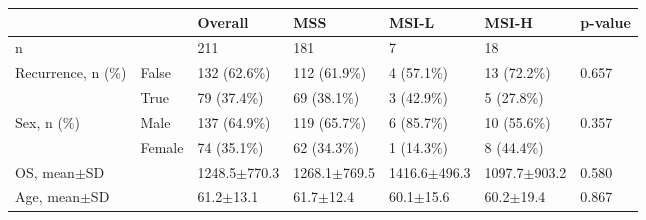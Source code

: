 \begin{tabular}{lllllll}
\hline
& & Overall & MSS & MSI-L & MSI-H & p-value \\
\hline
 n & & 211 & 181 & 7 & 18 & \\
 Recurrence, n (\%) & False & 132 (62.6\%) & 112 (61.9\%) & 4 (57.1\%) & 13 (72.2\%) & 0.657 \\
 & True & 79 (37.4\%) & 69 (38.1\%) & 3 (42.9\%) & 5 (27.8\%) & \\
 Sex, n (\%) & Male & 137 (64.9\%) & 119 (65.7\%) & 6 (85.7\%) & 10 (55.6\%) & 0.357 \\
 & Female & 74 (35.1\%) & 62 (34.3\%) & 1 (14.3\%) & 8 (44.4\%) & \\
 OS, mean$\pm$SD & & 1248.5$\pm$770.3 & 1268.1$\pm$769.5 & 1416.6$\pm$496.3 & 1097.7$\pm$903.2 & 0.580 \\
 Age, mean$\pm$SD & & 61.2$\pm$13.1 & 61.7$\pm$12.4 & 60.1$\pm$15.6 & 60.2$\pm$19.4 & 0.867 \\
\hline
\end{tabular}